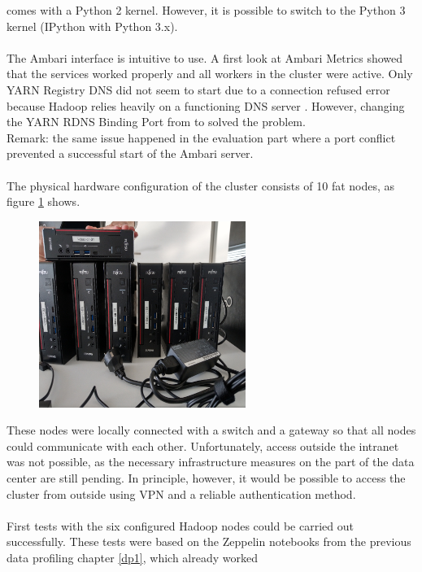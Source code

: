 comes with a Python 2 kernel. However, it is possible to switch to the Python 3 kernel (IPython
with Python 3.x).\\\\
The Ambari interface is intuitive to use. A first look at Ambari Metrics showed that the services
worked properly and all workers in the cluster were active. Only YARN Registry DNS did not seem
to start due to a connection refused error because Hadoop relies heavily on a functioning DNS
server \cite{RN4}. However, changing the YARN RDNS Binding Port from \grqq to \grqq solved the problem.\\ Remark: the same issue happened in the evaluation part where a port conflict prevented a successful start of the Ambari server.
\\\\
The physical hardware configuration of the cluster consists of 10 fat nodes, as figure \ref{fig:figure3_hadoop} shows.
\begin{figure}[H]
\centering
\includegraphics[width=0.6\textwidth]{img/figure3_hadoop}\label{fig:figure3_hadoop}
\label{fig:figure3_hadoop}
\end{figure}
These nodes were locally connected with a switch and a gateway so that all nodes could
communicate with each other. Unfortunately, access outside the intranet was not possible, as the
necessary infrastructure measures on the part of the data center are still pending. In principle,
however, it would be possible to access the cluster from outside using VPN and a reliable
authentication method.\\\\
First tests with the six configured Hadoop nodes could be carried out successfully. These tests were
based on the Zeppelin notebooks from the previous data profiling chapter \ref{dp1}, which already worked
